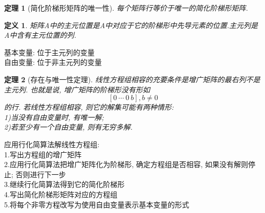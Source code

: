 \documentclass[UTF8,fontset=ubuntu]{ctexart}
\theoremstyle{plain}
\newtheorem{theorem}{定理}
\theoremstyle{nonumberplain}
\newtheorem{definition}{定义}
\theoremstyle{empty}
\begin{document}
\begin{theorem}[简化阶梯形矩阵的唯一性]
每个矩阵行等价于唯一的简化阶梯形矩阵.
\end{theorem}\vspace{2ex}

\begin{definition}
矩阵A中的{\heiti 主元位置}是A中对应于它的阶梯形中先导元素的位置.{\heiti 主元列}是A中含有主元位置的列.
\end{definition}\vspace{2ex}

基本变量: 位于主元列的变量\\
自由变量: 位于非主元列的变量\\[2ex]

\begin{theorem}[存在与唯一性定理]
线性方程组相容的充要条件是增广矩阵的最右列不是主元列. 也就是说, 增广矩阵的阶梯形没有形如
	\[[0\ \cdots\ 0\ b], b\neq 0\]
的行. 若线性方程组相容, 则它的解集可能有两种情形:\\
1)当没有自由变量时, 有唯一解;\\
2)若至少有一个自由变量, 则有无穷多解.
\end{theorem}\vspace{2ex}

应用行化简算法解线性方程组:\\
1.写出方程组的增广矩阵\\
2.应用行化简算法把增广矩阵化为阶梯形, 确定方程组是否相容, 如果没有解则停止; 否则进行下一步\\
3.继续行化简算法得到它的简化阶梯形\\
4.写出简化阶梯形矩阵对应的方程组\\
5.将每个非零方程改写为使用自由变量表示基本变量的形式\\[4ex]
\end{document}
